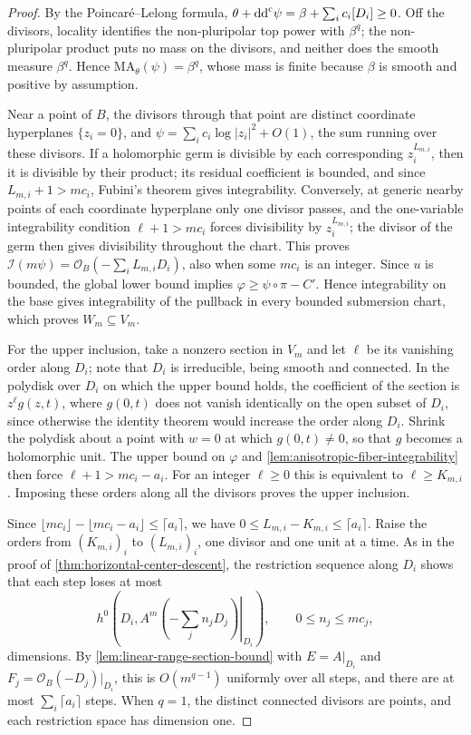 \begin{proof}
By the Poincar\'e--Lelong formula, $\theta+\mathrm{dd}^{\mathrm{c}}\psi=\beta+\sum_ic_i[D_i]\geq0$. Off the divisors, locality identifies the non-pluripolar top power with $\beta^q$; the non-pluripolar product puts no mass on the divisors, and neither does the smooth measure $\beta^q$. Hence $\mathrm{MA}_\theta(\psi)=\beta^q$, whose mass is finite because $\beta$ is smooth and positive by assumption.

Near a point of $B$, the divisors through that point are distinct coordinate hyperplanes $\{z_i=0\}$, and $\psi=\sum_ic_i\log|z_i|^2+O(1)$, the sum running over these divisors. If a holomorphic germ is divisible by each corresponding $z_i^{L_{m,i}}$, then it is divisible by their product; its residual coefficient is bounded, and since $L_{m,i}+1>mc_i$, Fubini's theorem gives integrability. Conversely, at generic nearby points of each coordinate hyperplane only one divisor passes, and the one-variable integrability condition $\ell+1>mc_i$ forces divisibility by $z_i^{L_{m,i}}$; the divisor of the germ then gives divisibility throughout the chart. This proves $\mathcal I(m\psi)=\mathcal O_B(-\sum_iL_{m,i}D_i)$, also when some $mc_i$ is an integer. Since $u$ is bounded, the global lower bound implies $\varphi\geq\psi\circ\pi-C'$. Hence integrability on the base gives integrability of the pullback in every bounded submersion chart, which proves $W_m\subseteq V_m$.

For the upper inclusion, take a nonzero section in $V_m$ and let $\ell$ be its vanishing order along $D_i$; note that $D_i$ is irreducible, being smooth and connected. In the polydisk over $D_i$ on which the upper bound holds, the coefficient of the section is $z^\ell g(z,t)$, where $g(0,t)$ does not vanish identically on the open subset of $D_i$, since otherwise the identity theorem would increase the order along $D_i$. Shrink the polydisk about a point with $w=0$ at which $g(0,t)\ne0$, so that $g$ becomes a holomorphic unit. The upper bound on $\varphi$ and \cref{lem:anisotropic-fiber-integrability} then force $\ell+1>mc_i-a_i$. For an integer $\ell\geq0$ this is equivalent to $\ell\geq K_{m,i}$. Imposing these orders along all the divisors proves the upper inclusion.

Since $\lfloor mc_i\rfloor-\lfloor mc_i-a_i\rfloor\leq\lceil a_i\rceil$, we have $0\leq L_{m,i}-K_{m,i}\leq\lceil a_i\rceil$. Raise the orders from $(K_{m,i})_i$ to $(L_{m,i})_i$, one divisor and one unit at a time. As in the proof of \cref{thm:horizontal-center-descent}, the restriction sequence along $D_i$ shows that each step loses at most
\[
 h^0\left(D_i,\left.A^m\left(-\sum_j n_jD_j\right)\right|_{D_i}\right),
 \qquad 0\leq n_j\leq mc_j,
\]
dimensions. By \cref{lem:linear-range-section-bound} with $E=A|_{D_i}$ and $F_j=\mathcal O_B(-D_j)|_{D_i}$, this is $O(m^{q-1})$ uniformly over all steps, and there are at most $\sum_i\lceil a_i\rceil$ steps. When $q=1$, the distinct connected divisors are points, and each restriction space has dimension one.
\end{proof}

